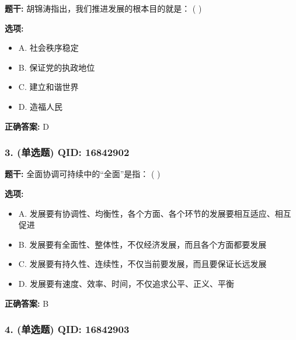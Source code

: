 \documentclass[12pt,UTF8]{ctexart}
\begin{document}
\textbf{题干:}
胡锦涛指出，我们推进发展的根本目的就是： ( )

\textbf{选项:}
\begin{itemize}[leftmargin=*]

  \item A. 社会秩序稳定

  \item B. 保证党的执政地位

  \item C. 建立和谐世界

  \item D. 造福人民

\end{itemize}

\textbf{正确答案:}
D

\vspace{0.3em}\hrulefill\vspace{0.7em}

\subsubsection*{3. (单选题) \small QID: 16842902}

\textbf{题干:}
全面协调可持续中的“全面”是指： ( )

\textbf{选项:}
\begin{itemize}[leftmargin=*]

  \item A. 发展要有协调性、均衡性，各个方面、各个环节的发展要相互适应、相互促进

  \item B. 发展要有全面性、整体性，不仅经济发展，而且各个方面都要发展

  \item C. 发展要有持久性、连续性，不仅当前要发展，而且要保证长远发展

  \item D. 发展要有速度、效率、时间，不仅追求公平、正义、平衡

\end{itemize}

\textbf{正确答案:}
B

\vspace{0.3em}\hrulefill\vspace{0.7em}

\subsubsection*{4. (单选题) \small QID: 16842903}
\end{document}
